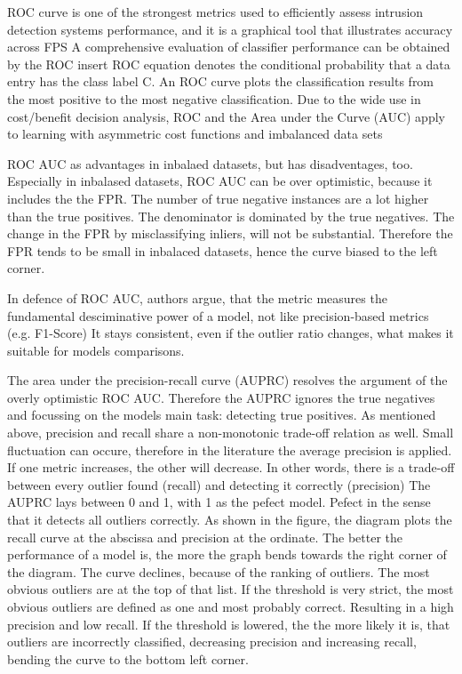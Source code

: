 ROC curve is one of the strongest metrics used to efficiently assess intrusion detection systems performance, and it is a graphical tool that illustrates accuracy across FPS \citep[postfix]{nassif2021}
A comprehensive evaluation of classifier performance can be obtained by the ROC insert ROC equation denotes the conditional probability that a data entry has the class label C. 
An ROC curve plots the classification results from the most positive to the most negative classification. 
Due to the wide use in cost/benefit decision analysis, ROC and the Area under the Curve (AUC) apply to learning with asymmetric cost functions and imbalanced data sets


ROC AUC as advantages in inbalaed datasets, but has disadventages, too.
Especially in inbalased datasets, ROC AUC can be over optimistic, because it includes the the FPR.
The number of true negative instances are a lot higher than the true positives. 
The denominator is dominated by the true negatives. \citep{davis2006relationship} 
The change in the FPR by misclassifying inliers, will not be substantial. 
Therefore the FPR tends to be small in inbalaced datasets, hence the curve biased to the left corner.


In defence of ROC AUC, authors  argue, that the metric measures the fundamental desciminative power of a model, not like precision-based metrics (e.g. F1-Score)
It stays consistent, even if the outlier ratio changes, what makes it suitable for models comparisons. 



The area under the precision-recall curve (AUPRC) resolves the argument of the overly optimistic ROC AUC.
Therefore the AUPRC ignores the true negatives and focussing on the models main task: detecting true positives.
As mentioned above, precision and recall share a non-monotonic trade-off relation as well.
Small fluctuation can occure, therefore in the literature the average precision is applied. 
If one metric increases, the other will decrease.
In other words, there is a trade-off between every outlier found (recall) and detecting it correctly (precision)
The AUPRC lays between 0 and 1, with 1 as the pefect model.
Pefect in the sense that it detects all outliers correctly.
As shown in the figure, the diagram plots the recall curve at the abscissa and precision at the ordinate.
The better the performance of a model is, the more the graph bends towards the right corner of the diagram.
The curve declines, because of the ranking of outliers. 
The most obvious outliers are at the top of that list.
If the threshold is very strict, the most obvious outliers are defined as one and most probably correct.
Resulting in a high precision and low recall.
If the threshold is lowered, the the more likely it is, that outliers are incorrectly classified, decreasing precision and increasing recall, bending the curve to the bottom left corner.


